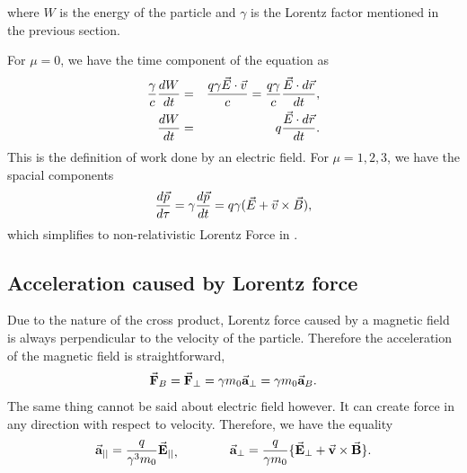 \documentclass[a4paper,oneside,12pt]{report}
\numberwithin{equation}{chapter}
\begin{document}
where $W$ is the energy of the particle and $\gamma$ is the Lorentz factor mentioned in the previous section.

For $ \mu = 0 $, we have the time component of the equation as
\vspace{-10pt}
\begin{eqnarray}
    \frac{\gamma}{c}\frac{d W}{d t} &=& \frac{q \gamma \vecthree{E}\cdot \vecthree{v}}{c} = \frac{q \gamma}{c}  \frac{\vecthree{E}  \cdot d \vecthree{r}}{d t}   ,\\
    \frac{d W}{d t} &=& q \frac{\vecthree{E}\cdot d \vecthree{r}} {d t} .
    \vspace{-10pt}
\end{eqnarray}
This is the definition of work done by an electric field. For $ \mu = 1,2,3 $, we have the spacial components
\vspace{-10pt}
\begin{equation*}
    \frac{d \vecthree{p}}{d \tau} = \gamma \frac{d \vecthree{p}}{d t} = q \gamma (\vecthree{E} + \vecthree{v} \times \vecthree{B}) ,
    \vspace{-10pt}
\end{equation*}
which simplifies to non-relativistic Lorentz Force in .


\subsection{Acceleration caused by Lorentz force}
Due to the nature of the cross product, Lorentz force caused by a magnetic field is always perpendicular to the velocity of the particle. 
Therefore the acceleration of the magnetic field is straightforward,
\vspace{-10pt}
\begin{equation*}
    \vecthreeBF{F}_B = \vecthreeBF{F}_{\perp} = \gamma  m_0\vecthreeBF{a}_{\perp} = \gamma  m_0\vecthreeBF{a}_{B} .
    \vspace{-10pt}
\end{equation*}
The same thing cannot be said about electric field however. 
It can create force in any direction with respect to velocity. Therefore, we have the equality
\vspace{-10pt}
\begin{equation} \label{eq:para_and_perp_acc_of_lorentz_force}
    \begin{aligned}
        \vecthreeBF{a}_{||} = \frac{q }{\gamma^3 m_0} \vecthreeBF{E}_{||}
    \end{aligned}  ,
    \qquad \qquad
    \begin{aligned}
        \vecthreeBF{a}_{\perp} = \frac{q}{\gamma m_0} \{ \vecthreeBF{E}_{\perp} + \crossProdBF{v}{B}   \} .
    \end{aligned}    
    \vspace{-10pt}
\end{equation}
\end{document}

